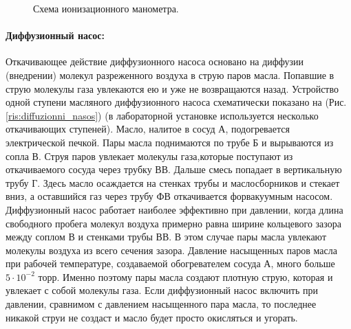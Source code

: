 \documentclass[a4paper, 12pt]{article}
\begin{document}
    \vspace{1cm}

    \begin{figure}[h]
        \caption{Схема ионизационного манометра.}
        \label{ris:ionizacionni_monometr}
    \end{figure}

    \newpage

    \paragraph{Диффузионный насос:}
    Откачивающее действие диффузионного насоса основано на диффузии (внедрении) молекул разреженного воздуха в струю паров масла. Попавшие в струю молекулы газа увлекаются ею и уже не возвращаются назад. Устройство одной ступени масляного диффузионного насоса схематически показано на (Рис. \ref{ris:diffuzionni_nasos}) (в лабораторной установке используется несколько откачивающих ступеней). Масло, налитое в сосуд А, подогревается электрической печкой. Пары масла поднимаются по трубе Б и вырываются из сопла В. Струя паров увлекает молекулы газа,которые поступают из откачиваемого сосуда через трубку ВВ. Дальше смесь попадает в вертикальную трубу Г. Здесь масло осаждается на стенках трубы и маслосборников и стекает вниз, а оставшийся газ через трубу ФВ откачивается форвакуумным насосом. Диффузионный насос работает наиболее эффективно при давлении, когда длина свободного пробега молекул воздуха примерно равна ширине кольцевого зазора между соплом В и стенками трубы ВВ. В этом случае пары масла увлекают молекулы воздуха из всего сечения зазора. Давление насыщенных паров масла при рабочей температуре, создаваемой обогревателем сосуда А, много больше $5\cdot10^{-2}$ торр. Именно поэтому пары масла создают плотную струю, которая и увлекает с собой молекулы газа. Если диффузионный насос включить при давлении, сравнимом с давлением насыщенного пара масла, то последнее никакой струи не создаст и масло будет просто окисляться и угорать.
\end{document}
